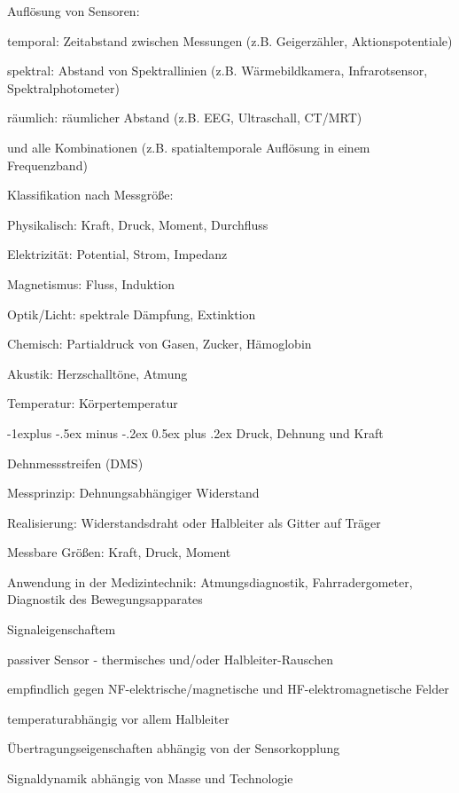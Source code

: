\documentclass[a4paper]{article}
\makeatletter
\renewcommand{\subsection}{\@startsection{subsection}{2}{0mm}%
 {-1explus -.5ex minus -.2ex}%
 {0.5ex plus .2ex}%
 {\normalfont\normalsize\bfseries}}
\makeatother
\begin{document}
\begin{multicols}{3}
  Auflösung von Sensoren:

  \begin{itemize*}
    \item temporal: Zeitabstand zwischen Messungen (z.B. Geigerzähler, Aktionspotentiale)
    \item spektral: Abstand von Spektrallinien (z.B. Wärmebildkamera, Infrarotsensor, Spektralphotometer)
    \item räumlich: räumlicher Abstand (z.B. EEG, Ultraschall, CT/MRT)
    \item und alle Kombinationen (z.B. spatialtemporale Auflösung in einem Frequenzband)
  \end{itemize*}

  Klassifikation nach Messgröße:

  \begin{itemize*}
    \item Physikalisch: Kraft, Druck, Moment, Durchfluss
    \item Elektrizität: Potential, Strom, Impedanz
    \item Magnetismus: Fluss, Induktion
    \item Optik/Licht: spektrale Dämpfung, Extinktion
    \item Chemisch: Partialdruck von Gasen, Zucker, Hämoglobin
    \item Akustik: Herzschalltöne, Atmung
    \item Temperatur: Körpertemperatur
  \end{itemize*}

  \subsection{Druck, Dehnung und Kraft}

  Dehnmessstreifen (DMS)

  \begin{itemize*}
    \item Messprinzip: Dehnungsabhängiger Widerstand
    \item Realisierung: Widerstandsdraht oder Halbleiter als Gitter auf Träger
    \item Messbare Größen: Kraft, Druck, Moment
    \item Anwendung in der Medizintechnik: Atmungsdiagnostik, Fahrradergometer, Diagnostik des Bewegungsapparates
    \item Signaleigenschaftem
    \begin{itemize*}
      \item passiver Sensor - thermisches und/oder Halbleiter-Rauschen
      \item empfindlich gegen NF-elektrische/magnetische und HF-elektromagnetische Felder
      \item temperaturabhängig vor allem Halbleiter
      \item Übertragungseigenschaften abhängig von der Sensorkopplung
      \item Signaldynamik abhängig von Masse und Technologie  \end{itemize*}
  \end{itemize*}


\end{multicols}
\end{document}
